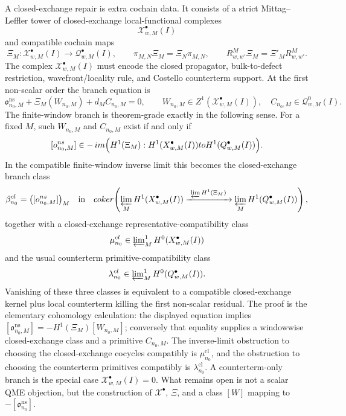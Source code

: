 \begin{enumerate}
	  A closed-exchange repair is extra cochain data.  It consists of a
	  strict Mittag--Leffler tower of closed-exchange local-functional
	  complexes
	  \[
	    \mathcal X^\bullet_{w,M}(I)
	  \]
	  and compatible cochain maps
	  \[
	    \Xi_M\colon
	    \mathcal X^\bullet_{w,M}(I)
	      \longrightarrow
	    \mathcal Q^\bullet_{w,M}(I),
	    \qquad
	    \pi_{M,N}\Xi_M=\Xi_N\pi_{M,N},
	    \qquad
	    R^M_{w,w'}\Xi_M=\Xi'_M R^M_{w,w'} .
	  \]
	  The complex \(\mathcal X^\bullet_{w,M}(I)\) must encode the closed
	  propagator, bulk-to-defect restriction, wavefront/locality rule, and
	  Costello counterterm support.  At the first non-scalar order the
	  branch equation is
	  \[
	    \mathfrak o^{\mathrm{ns}}_{n_0,M}
	      +\Xi_M(W_{n_0,M})
	      +d_M C_{n_0,M}=0,
	    \qquad
	    W_{n_0,M}\in Z^1(\mathcal X^\bullet_{w,M}(I)),\quad
	    C_{n_0,M}\in\mathcal Q^0_{w,M}(I).
	  \]
	  The finite-window branch is theorem-grade exactly in the following
	  sense.  For a fixed \(M\), such \(W_{n_0,M}\) and \(C_{n_0,M}\) exist
	  if and only if
	  \[
	    [\mathfrak o^{\mathrm{ns}}_{n_0,M}]
	      \in
	    -\,\operatorname{im}
	    \Bigl(
	      H^1(\Xi_M)\colon
	      H^1(\mathcal X^\bullet_{w,M}(I))
	      \to
	      H^1(\mathcal Q^\bullet_{w,M}(I))
	    \Bigr).
	  \]
	  In the compatible finite-window inverse limit this becomes the
	  closed-exchange branch class
	  \[
	    \beta^{\mathrm{cl}}_{n_0}
	      =
	      \bigl([\mathfrak o^{\mathrm{ns}}_{n_0,M}]\bigr)_M
	      \quad\text{in}\quad
	      \operatorname{coker}\!\left(
	        \varprojlim_M H^1(\mathcal X^\bullet_{w,M}(I))
	        \xrightarrow{\ \varprojlim H^1(\Xi_M)\ }
	        \varprojlim_M H^1(\mathcal Q^\bullet_{w,M}(I))
	      \right),
	  \]
	  together with a closed-exchange representative-compatibility class
	  \[
	    \mu^{\mathrm{cl}}_{n_0}
	      \in
	      \varprojlim\nolimits^1_M
	      H^0(\mathcal X^\bullet_{w,M}(I))
	  \]
	  and the usual counterterm primitive-compatibility class
	  \[
	    \lambda^{\mathrm{cl}}_{n_0}
	      \in
	      \varprojlim\nolimits^1_M
	      H^0(\mathcal Q^\bullet_{w,M}(I)).
	  \]
	  Vanishing of these three classes is equivalent to a compatible
	  closed-exchange kernel plus local counterterm killing the first
	  non-scalar residual.  The proof is the elementary cohomology
	  calculation: the displayed equation implies
	  \([\mathfrak o^{\mathrm{ns}}_{n_0,M}]
	  =-H^1(\Xi_M)[W_{n_0,M}]\); conversely that equality supplies a
	  windowwise closed-exchange class and a primitive \(C_{n_0,M}\).  The
	  inverse-limit obstruction to choosing the closed-exchange cocycles
	  compatibly is \(\mu^{\mathrm{cl}}_{n_0}\), and the obstruction to
	  choosing the counterterm primitives compatibly is
	  \(\lambda^{\mathrm{cl}}_{n_0}\).  A counterterm-only branch is the special
	  case \(\mathcal X^\bullet_{w,M}(I)=0\).  What remains open is not a
	  scalar QME objection, but the construction of \(\mathcal X^\bullet\),
	  \(\Xi\), and a class \([W]\) mapping to
	  \(-[\mathfrak o^{\mathrm{ns}}_{n_0}]\).


\end{enumerate}
